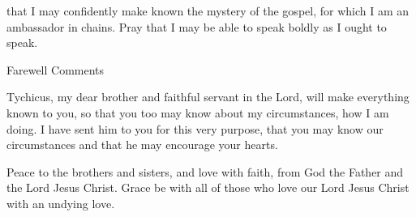 {that I
may confidently
make known
the mystery
of the gospel,
for
which
I am an ambassador
in
chains.
Pray that
I may be able to speak boldly
as
I
ought
to speak.
\par }{\SH Farewell Comments
\par }{\PP {}Tychicus,
my dear
brother
and
faithful
servant
in
the Lord,
will make
everything
known
to you,
so that
you
too may know
about my
circumstances,
how
I am doing.
I have sent
him
to
you
for
this
very purpose, that
you may know
our circumstances
and
that he may encourage
your
hearts.
\par }{\PP {}Peace
to the brothers and sisters,
and
love
with
faith,
from
God
the Father
and
the Lord
Jesus
Christ.
Grace
be with
all
of those who love
our
Lord
Jesus
Christ
with
an undying love.
\par }